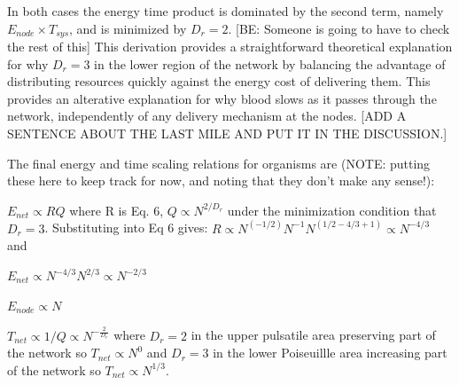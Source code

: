 \documentclass[12pt]{article}
\begin{document}
In both cases the energy time product is dominated by the second term, namely
$E_{node} \times T_{sys}$, and is minimized by $D_r =2$. [BE: Someone is going
to have to check the rest of this]
This derivation provides a straightforward theoretical explanation for why $D_r =
3$ in the lower region of the network by balancing the advantage of
distributing resources quickly against the energy cost of delivering
them.  This provides an alterative explanation for why blood slows
as it passes through the network, independently of any delivery
mechanism at the nodes.  [ADD A SENTENCE ABOUT THE LAST MILE AND PUT
IT IN THE DISCUSSION.]


The final energy and time scaling relations for 
organisms are  (NOTE:  putting these here to keep track for now, and noting that they don't make any sense!):

$E_{net} \propto RQ$ where R is Eq. 6,  $Q \propto N^{2/D_r}$ under the minimization condition that $D_r = 3$.
Substituting into Eq 6 gives: $R \propto N^{(-1/2)} N^{-1} N^{(1/2 - 4/3 + 1)} \propto N^{-4/3}$ and

$E_{net} \propto N^{-4/3} N^{2/3} \propto N^{-2/3} $

$E_{node} \propto N$ %

$T_{net} \propto 1/Q \propto N^{-\frac{2}{D_r}}$ where $D_r = 2$ in the upper pulsatile area preserving part of the network so $T_{net} \propto N^{0} $ and $D_r = 3$ in the lower Poiseuillle area increasing part of the network so $T_{net} \propto N^{1/3}$.
\end{document}
